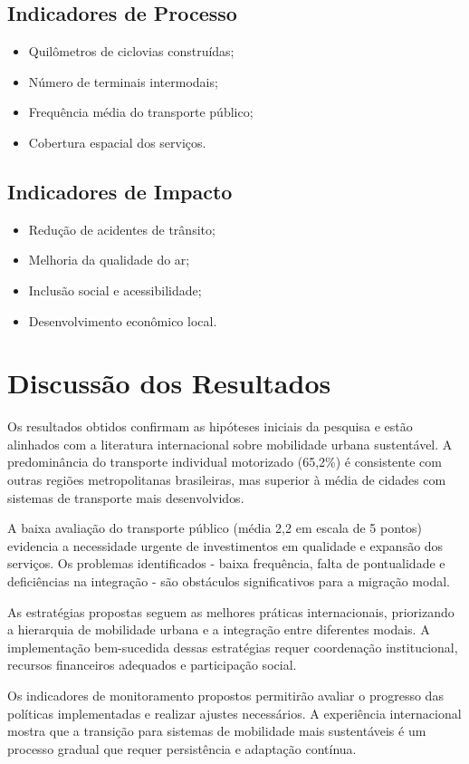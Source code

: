 \subsection{Indicadores de Processo}
\begin{itemize}
    \item Quilômetros de ciclovias construídas;
    \item Número de terminais intermodais;
    \item Frequência média do transporte público;
    \item Cobertura espacial dos serviços.
\end{itemize}

\subsection{Indicadores de Impacto}
\begin{itemize}
    \item Redução de acidentes de trânsito;
    \item Melhoria da qualidade do ar;
    \item Inclusão social e acessibilidade;
    \item Desenvolvimento econômico local.
\end{itemize}

\section{Discussão dos Resultados}

Os resultados obtidos confirmam as hipóteses iniciais da pesquisa e estão alinhados com a literatura internacional sobre mobilidade urbana sustentável. A predominância do transporte individual motorizado (65,2\%) é consistente com outras regiões metropolitanas brasileiras, mas superior à média de cidades com sistemas de transporte mais desenvolvidos.

A baixa avaliação do transporte público (média 2,2 em escala de 5 pontos) evidencia a necessidade urgente de investimentos em qualidade e expansão dos serviços. Os problemas identificados - baixa frequência, falta de pontualidade e deficiências na integração - são obstáculos significativos para a migração modal.

As estratégias propostas seguem as melhores práticas internacionais, priorizando a hierarquia de mobilidade urbana e a integração entre diferentes modais. A implementação bem-sucedida dessas estratégias requer coordenação institucional, recursos financeiros adequados e participação social.

Os indicadores de monitoramento propostos permitirão avaliar o progresso das políticas implementadas e realizar ajustes necessários. A experiência internacional mostra que a transição para sistemas de mobilidade mais sustentáveis é um processo gradual que requer persistência e adaptação contínua.